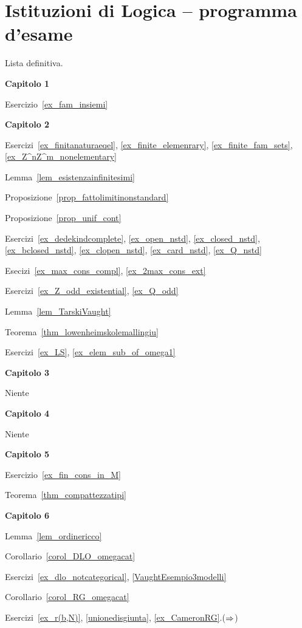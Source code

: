 \chapter*{Istituzioni di Logica -- programma d'esame }

Lista definitiva.

\textbf{Capitolo 1}

Esercizio~\ref{ex_fam_insiemi} 

\textbf{Capitolo 2}

Esercizi~\ref{ex_finitanaturaeqel}, \ref{ex_finite_elemenrary}, \ref{ex_finite_fam_sets}, \ref{ex_Z^nZ^m_nonelementary}

Lemma~\ref{lem_esistenzainfinitesimi}

Proposizione~\ref{prop_fattolimitinonstandard}

Proposizione~\ref{prop_unif_cont}

Esercizi~\ref{ex_dedekindcomplete}, \ref{ex_open_nstd}, \ref{ex_closed_nstd}, \ref{ex_bclosed_nstd}, \ref{ex_clopen_nstd}, \ref{ex_card_nstd}, \ref{ex_Q_nstd}

Esecizi~\ref{ex_max_cons_compl}, \ref{ex_2max_cons_ext}

Esercizi~\ref{ex_Z_odd_existential}, \ref{ex_Q_odd}

Lemma~\ref{lem_TarskiVaught}

Teorema~\ref{thm_lowenheimskolemallingiu}

Esercizi~\ref{ex_LS}, \ref{ex_elem_sub_of_omega1}

\textbf{Capitolo 3}

Niente


\textbf{Capitolo 4}

Niente

\textbf{Capitolo 5}

Esercizio~\ref{ex_fin_cons_in_M}

Teorema~\ref{thm_compattezzatipi}

\textbf{Capitolo 6}

Lemma~\ref{lem_ordinericco}

Corollario~\ref{corol_DLO_omegacat}

Esercizi~\ref{ex_dlo_notcategorical}, \ref{VaughtEsempio3modelli}

Corollario~\ref{corol_RG_omegacat}

Esercizi~\ref{ex_r(b,N)}, \ref{unionedisgiunta}, \ref{ex_CameronRG}.($\Rightarrow$) 

